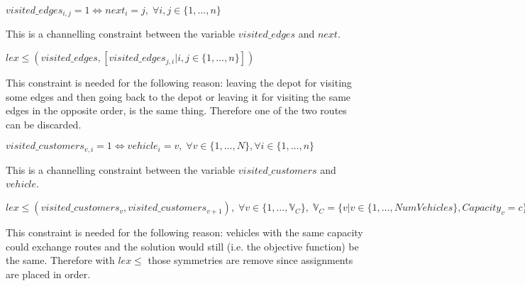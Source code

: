 \documentclass[../main.tex]{subfiles}
\begin{document}
\begin{center} %
    \begin{math}
        visited\_edges_{i,j} = 1 \Leftrightarrow next_i = j, \; \forall i,j \in \{1,\dots,n\}
    \end{math}
\end{center}
This is a channelling constraint between the variable $visited\_edges$ and $next$.

\begin{center} %
    \begin{math}
        lex\leq(visited\_edges, [visited\_edges_{j,i} | i,j \in \{1,\dots,n\}])
    \end{math}
\end{center}
This constraint is needed for the following reason: leaving the depot for visiting some edges and then going back to the depot or leaving it for visiting the same edges in the opposite order, is the same thing. Therefore one of the two routes can be discarded.

\begin{center} %
    \begin{math}
        visited\_customers_{v,i} = 1 \Leftrightarrow vehicle_i = v, \; \forall v \in \{1,\dots,N\}, \forall i \in \{1,\dots,n\}
    \end{math}
\end{center}
This is a channelling constraint between the variable $visited\_customers$ and $vehicle$.

\begin{center} %
    \begin{math}
        lex\leq(visited\_customers_{v}, visited\_customers_{v+1}), \;
        \forall v \in \{1,\dots,\mathbb{V}_{C}\}, \;
        \mathbb{V}_{C} = \{v | v \in \{1,\dots,NumVehicles\}, Capacity_v = c\}, \;
        \forall c \in Capacity
    \end{math}
\end{center}
This constraint is needed for the following reason: vehicles with the same capacity could exchange routes and the solution would still (i.e. the objective function) be the same. Therefore with $lex\leq$ those symmetries are remove since assignments are placed in order.
\end{document}
